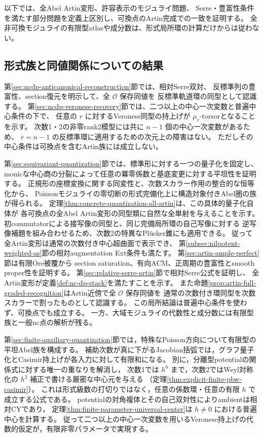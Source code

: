 \documentclass[a4paper,11pt]{ltjsarticle}
\numberwithin{equation}{section}
\theoremstyle{plain}
\theoremstyle{definition}
\theoremstyle{remark}
\newcommand{\OO}{\mathcal O}
\begin{document}
以下では、全Abel Artin変形、許容表示のモジュライ問題、
Serre・豊富性条件を満たす部分問題を定義上区別し、可換点のArtin完成での一致を証明する。
全非可換モジュライの有限型atlasや成分数は、形式局所環の計算だけからは従わない。

\subsection{形式族と同値関係についての結果}
第\ref{sec:ncdp-anticanonical-reconstruction}節では、相対Serre双対、
反標準列の豊富性、section復元を明示して、全 $\OO$ 保存同値を
反標準軌道環の同型として認識する。
第\ref{sec:ncdp-veronese-recovery}節では、二つ以上の中心一次変数と普遍中心条件の下で、
任意の $r$ に対するVeronese同型の持上げが $\mu_r$-torsorとなることを示す。
次数1・2の非零rank2模型には共に $n-1$ 個の中心一次変数があるため、
$r=n-1$ の反標準環に適用するための次元上の障害はない。
ただしその中心条件は可換点を含むArtin族には成立しない。

第\ref{sec:equivariant-quantization}節では、標準形に対する一つの量子化を固定し、
monicな中心商の分裂によって任意の冪零係数と基底変更に対する平坦性を証明する。
正規形の座標変換に関する同変性と、次数スカラー作用の整合的な恒等化から、
Poissonモジュライの零切断の形式完備化上に構造対象付きAbel圏の族が得られる。
定理\ref{thm:concrete-quantization-all-artin}は、この具体的量子化自体が
各可換点の全Abel Artin変形の同型類に自然な全単射を与えることを示す。
初commutatorによる接写像の同型と、同じ完備局所環の自己写像に対する
逆写像補題を組み合わせるため、次数2の特異なPl\"ucker錐にも適用できる。
従って全Artin変形は通常の次数付き中心超曲面で表示でき、
第\ref{subsec:nilpotent-weighted-as}節の相対augmentation Ext条件も満たす。
第\ref{sec:artin-ample-perfect}節は有限Ore被覆から
section saturation、有向ACM、正周期の豊富性とsmooth proper性を証明する。
第\ref{sec:relative-serre-artin}節で相対Serre公式を証明し、
全Artin変形が定義\ref{def:nc-dp-stack}を満たすことを示す。
また命題\ref{prop:artin-full-graded-recognition}はArtin近傍で全 $\OO$ 保存同値を
通常の次数付き環同型を次数スカラーで割ったものとして認識する。
この局所結論は普遍中心条件を使わず、可換点でも成立する。
一方、大域モジュライの代数性と成分数には有限型族と一般nc点の解析が残る。

第\ref{sec:finite-auxiliary-quantization}節では，特殊なPoisson方向について有限型の平坦Abel族を構成する。
補助次数が真に下がるJacobian括弧では，グラフ量子化とCasimir持上げが各入力に対して有限和になる。
別に，分離型potentialの関係式に対する唯一の重なりを解消し，
次数1では $h^6$ まで，次数2ではWeyl対称化の $h^2$ 補正で書ける厳密な中心元を与える
（定理\ref{thm:explicit-finite-pbw-casimir}）。
これは形式級数の打切りではなく，任意の係数環・任意の有限 $h$ で成立する公式である。
potentialの対角複体とその自己双対性によりambientは相対CYであり，
定理\ref{thm:finite-parameter-universal-center}は $h\ne0$ における普遍中心を計算する。
従って二つ以上の中心一次変数を用いるVeronese持上げの代数的仮定が，有限非零パラメータで実現する。
\end{document}

